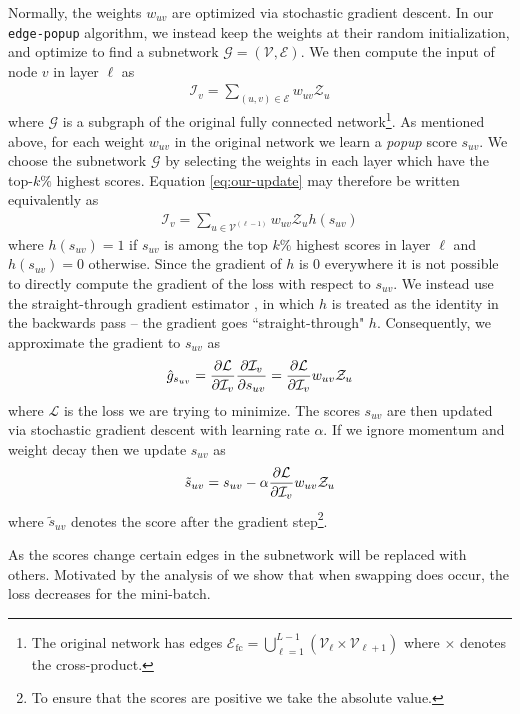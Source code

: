 \documentclass[10pt,twocolumn,letterpaper]{article}
\newcommand*{\G}{\mathcal{G}}
\newcommand*{\V}{\mathcal{V}}
\newcommand*{\E}{\mathcal{E}}
\newcommand*{\I}{\mathcal{I}}
\newcommand*{\loss}{\mathcal{L}}
\newcommand*{\Z}{\mathcal{Z}}
\newcommand{\alg}{\texttt{edge-popup} }
\begin{document}
Normally, the weights $w_{uv}$ are optimized via stochastic gradient descent. In our \alg algorithm, we instead keep the weights at their random initialization, and optimize to find a subnetwork $\G = (\V, \E)$. We then compute the input of node $v$ in layer $\ell$ as 
\begin{align} \label{eq:our-update}
    \I_{v} = \sum_{(u,v) \in \E} w_{uv} \Z_u
\end{align}
where $\G$ is a subgraph of the original fully connected network\footnote{The original network has edges $\E_\textrm{fc} = \bigcup_{\ell = 1}^{L-1} \left( \V_{\ell} \times \V_{\ell + 1}\right)$ where $\times$ denotes the cross-product.}.  As mentioned above, for each weight $w_{uv}$ in the original network we learn a \textit{popup} score $s_{uv}$. We choose the subnetwork $\G$ by selecting the weights in each layer which have the top-$k\%$ highest scores. Equation \ref{eq:our-update} may therefore be written equivalently as 
\begin{align} \label{eq:our-update2}
    \I_{v} = \sum_{u \in \V^{(\ell - 1)}} w_{uv} \Z_u h(s_{uv})
\end{align}
where $h(s_{uv}) = 1$ if $s_{uv}$ is among the top $k\%$ highest scores in layer $\ell$ and $h(s_{uv}) = 0$ otherwise. Since the gradient of $h$ is 0 everywhere it is not possible to directly compute the gradient of the loss with respect to $s_{uv}$. We instead use the straight-through gradient estimator \cite{ste}, in which $h$ is treated as the identity in the backwards pass -- the gradient goes ``straight-through" $h$. Consequently, we approximate the gradient to $s_{uv}$ as
\begin{align}
    \hat g_{s_{uv}} = \pdv{\loss}{\I_v}\pdv{\I_v}{s_{uv}} = \pdv{\loss}{\I_v} w_{uv}\Z_u
\end{align}
where $\loss$ is the loss we are trying to minimize. The scores $s_{uv}$ are then updated via stochastic gradient descent with learning rate $\alpha$. If we ignore momentum and weight decay \cite{wd} then we update $s_{uv}$ as
\begin{align} \label{eq:update-rule}
    \tilde s_{uv} = s_{uv} - \alpha \pdv{\loss}{\I_v} w_{uv}\Z_u
\end{align}
where $\tilde s_{uv}$ denotes the score after the gradient step\footnote{To ensure that the scores are positive we take the absolute value.}.

As the scores change certain edges in the subnetwork will be replaced with others. Motivated by the analysis of \cite{dnw} we show that when swapping does occur, the loss decreases for the mini-batch. 
\end{document}

